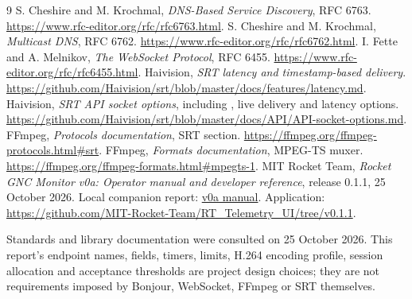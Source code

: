 \begin{thebibliography}{9}
 S. Cheshire and M. Krochmal, \emph{DNS-Based Service Discovery},
RFC 6763. \url{https://www.rfc-editor.org/rfc/rfc6763.html}.
 S. Cheshire and M. Krochmal, \emph{Multicast DNS}, RFC 6762.
\url{https://www.rfc-editor.org/rfc/rfc6762.html}.
 I. Fette and A. Melnikov, \emph{The WebSocket Protocol},
RFC 6455. \url{https://www.rfc-editor.org/rfc/rfc6455.html}.
 Haivision, \emph{SRT latency and timestamp-based delivery}.
\url{https://github.com/Haivision/srt/blob/master/docs/features/latency.md}.
 Haivision, \emph{SRT API socket options}, including
, live delivery and latency options.
\url{https://github.com/Haivision/srt/blob/master/docs/API/API-socket-options.md}.
 FFmpeg, \emph{Protocols documentation}, SRT section.
\url{https://ffmpeg.org/ffmpeg-protocols.html#srt}.
 FFmpeg, \emph{Formats documentation}, MPEG-TS muxer.
\url{https://ffmpeg.org/ffmpeg-formats.html#mpegts-1}.
 MIT Rocket Team, \emph{Rocket GNC Monitor v0a: Operator
manual and developer reference}, release 0.1.1, 25 October 2026.
Local companion report: \href{../v0a/Rocket_GNC_Monitor_v0a.pdf}{v0a manual}.
Application: \url{https://github.com/MIT-Rocket-Team/RT_Telemetry_UI/tree/v0.1.1}.
\end{thebibliography}
Standards and library documentation were consulted on 25 October 2026. This
report's endpoint names, fields, timers, limits, H.264 encoding profile, session
allocation and acceptance thresholds are project design choices; they are not
requirements imposed by Bonjour, WebSocket, FFmpeg or SRT themselves.
